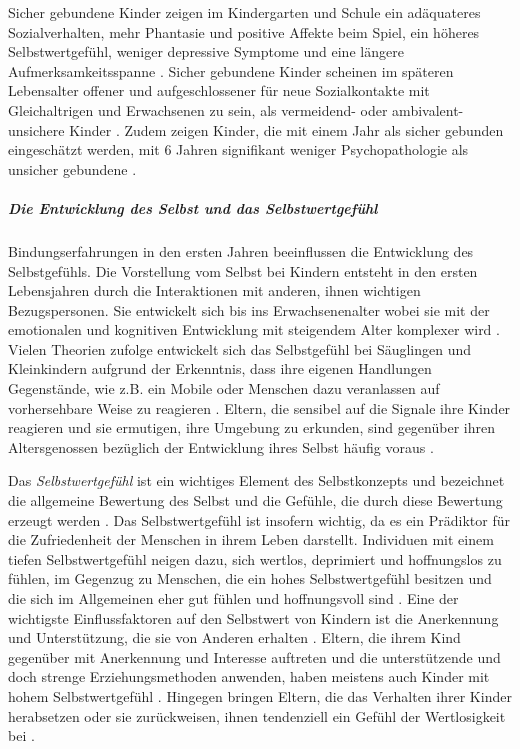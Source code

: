 Sicher gebundene Kinder zeigen im Kindergarten und Schule ein adäquateres Sozialverhalten, mehr Phantasie und positive Affekte beim Spiel, ein höheres Selbstwertgefühl, weniger depressive Symptome und eine längere Aufmerksamkeitsspanne \cite{Dornes1993, Zeanah1994}. Sicher gebundene Kinder scheinen im späteren Lebensalter offener und aufgeschlossener für neue Sozialkontakte mit Gleichaltrigen und Erwachsenen zu sein, als vermeidend- oder ambivalent-unsichere Kinder \cite{Resch1999}. Zudem zeigen Kinder, die mit einem Jahr als sicher gebunden eingeschätzt werden, mit 6 Jahren signifikant weniger Psychopathologie als unsicher gebundene \cite{Lewis1984}.

\subparagraph{Die Entwicklung des Selbst und das Selbstwertgefühl}\label{par:EntwSelbst}
Bindungserfahrungen in den ersten Jahren beeinflussen die Entwicklung des Selbstgefühls. Die Vorstellung vom Selbst bei Kindern entsteht in den ersten Lebensjahren durch die Interaktionen mit anderen, ihnen wichtigen Bezugspersonen. Sie entwickelt sich bis ins Erwachsenenalter wobei sie mit der emotionalen und kognitiven Entwicklung mit steigendem Alter komplexer wird \cite[S.~602ff]{Siegler2008}. Vielen Theorien zufolge entwickelt sich das Selbstgefühl bei Säuglingen und Kleinkindern aufgrund der Erkenntnis, dass ihre eigenen Handlungen Gegenstände, wie z.B. ein Mobile oder Menschen dazu veranlassen auf vorhersehbare Weise zu reagieren \cite{Harter1998}. Eltern, die sensibel auf die Signale ihre Kinder reagieren und sie ermutigen, ihre Umgebung zu erkunden, sind gegenüber ihren Altersgenossen bezüglich der Entwicklung ihres Selbst häufig voraus \cite{Pipp1992}. 

Das \textit{Selbstwertgefühl} ist ein wichtiges Element des Selbstkonzepts und bezeichnet die allgemeine Bewertung des Selbst und die Gefühle, die durch diese Bewertung erzeugt werden \cite{Crocker2001}. Das Selbstwertgefühl ist insofern wichtig, da es ein Prädiktor für die Zufriedenheit der Menschen in ihrem Leben darstellt. Individuen mit einem tiefen Selbstwertgefühl neigen dazu, sich wertlos, deprimiert und hoffnungslos zu fühlen, im Gegenzug zu Menschen, die ein hohes Selbstwertgefühl besitzen und die sich im Allgemeinen eher gut fühlen und hoffnungsvoll sind \cite{Harter1999}. Eine der wichtigste Einflussfaktoren auf den Selbstwert von Kindern ist die Anerkennung und Unterstützung, die sie von Anderen erhalten \cite{Siegler2008}. Eltern, die ihrem Kind gegenüber mit Anerkennung und Interesse auftreten und die unterstützende und doch strenge Erziehungsmethoden anwenden, haben meistens auch Kinder mit hohem Selbstwertgefühl \cite{Feiring1996}. Hingegen bringen Eltern, die das Verhalten ihrer Kinder herabsetzen oder sie zurückweisen, ihnen tendenziell ein Gefühl der Wertlosigkeit bei \cite{Harter1999}. 

